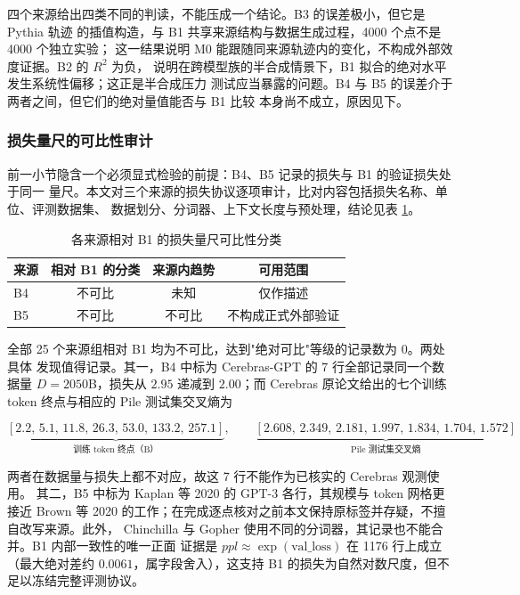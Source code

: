 \documentclass[bwprint]{gmcmthesis}
\numberwithin{equation}{section}
\numberwithin{figure}{section}
\numberwithin{table}{section}
\begin{document}
四个来源给出四类不同的判读，不能压成一个结论。B3 的误差极小，但它是 Pythia 轨迹
的插值构造，与 B1 共享来源结构与数据生成过程，4000 个点不是 4000 个独立实验；
这一结果说明 M0 能跟随同来源轨迹内的变化，不构成外部效度证据。B2 的 $R^2$ 为负，
说明在跨模型族的半合成情景下，B1 拟合的绝对水平发生系统性偏移；这正是半合成压力
测试应当暴露的问题。B4 与 B5 的误差介于两者之间，但它们的绝对量值能否与 B1 比较
本身尚不成立，原因见下。

\subsubsection{损失量尺的可比性审计}

前一小节隐含一个必须显式检验的前提：B4、B5 记录的损失与 B1 的验证损失处于同一
量尺。本文对三个来源的损失协议逐项审计，比对内容包括损失名称、单位、评测数据集、
数据划分、分词器、上下文长度与预处理，结论见表 \ref{tab:q2-protocol}。

\begin{table}[htp!]
\centering
\renewcommand\arraystretch{1.2}
\caption{各来源相对 B1 的损失量尺可比性分类}\label{tab:q2-protocol}
\begin{tabular*}{\textwidth}{@{\extracolsep{\fill}}lccc@{}}
\toprule
来源 & 相对 B1 的分类 & 来源内趋势 & 可用范围 \\
\midrule
B4 & 不可比 & 未知 & 仅作描述 \\
B5 & 不可比 & 不可比 & 不构成正式外部验证 \\
\bottomrule
\end{tabular*}
\end{table}

全部 25 个来源组相对 B1 均为不可比，达到"绝对可比"等级的记录数为 0。两处具体
发现值得记录。其一，B4 中标为 Cerebras-GPT 的 7 行全部记录同一个数据量
$D=2050$B，损失从 $2.95$ 递减到 $2.00$；而 Cerebras 原论文给出的七个训练 token
终点与相应的 Pile 测试集交叉熵为

\begin{equation}
\underbrace{[2.2,\,5.1,\,11.8,\,26.3,\,53.0,\,133.2,\,257.1]}_{\text{训练 token 终点（B）}},
\qquad
\underbrace{[2.608,\,2.349,\,2.181,\,1.997,\,1.834,\,1.704,\,1.572]}_{\text{Pile 测试集交叉熵}}
\end{equation}

两者在数据量与损失上都不对应，故这 7 行不能作为已核实的 Cerebras 观测使用。
其二，B5 中标为 Kaplan 等 2020 的 GPT-3 各行，其规模与 token 网格更接近 Brown 等
2020 的工作；在完成逐点核对之前本文保持原标签并存疑，不擅自改写来源。此外，
Chinchilla 与 Gopher 使用不同的分词器，其记录也不能合并。B1 内部一致性的唯一正面
证据是 $ppl\approx\exp(\mathrm{val\_loss})$ 在 1176 行上成立（最大绝对差约
$0.0061$，属字段舍入），这支持 B1 的损失为自然对数尺度，但不足以冻结完整评测协议。
\end{document}
